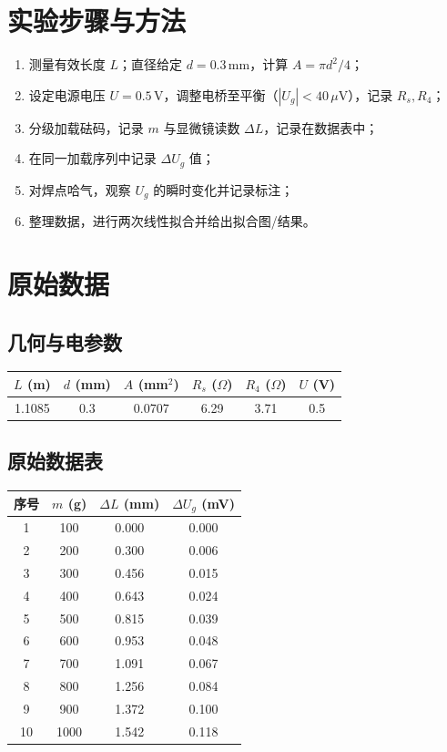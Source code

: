 \documentclass[12pt,a4paper]{article}
\begin{document}
\section{实验步骤与方法}
\begin{enumerate}
    \item 测量有效长度 $L$；直径给定 $d=0.3\,\mathrm{mm}$，计算 $A=\pi d^2/4$；
    \item 设定电源电压 $U=0.5\,\mathrm{V}$，调整电桥至平衡（$|U_g|<40\,\mu$V），记录 $R_s, R_4$；
    \item 分级加载砝码，记录 $m$ 与显微镜读数 $\Delta L$，记录在数据表中；
    \item 在同一加载序列中记录 $\Delta U_g$ 值；
    \item 对焊点哈气，观察 $U_g$ 的瞬时变化并记录标注；
    \item 整理数据，进行两次线性拟合并给出拟合图/结果。 
\end{enumerate}

\section{原始数据}
\subsection*{几何与电参数}
\begin{center}
\begin{tabular}{cccccc}
	\toprule
    $L$ (m) & $d$ (mm) & $A$ (mm$^2$) & $R_s$ ($\Omega$) & $R_4$ ($\Omega$) & $U$ (V) \\
    \midrule
	1.1085 & 0.3 & 0.0707 & 6.29 & 3.71 & 0.5 \\
    \bottomrule
\end{tabular}
\end{center}
\subsection*{原始数据表}
\begin{center}
\begin{tabular}{cccc}
\toprule
序号 & $m$ (g) & $\Delta L$ (mm) & $\Delta U_g$ (mV) \\
\midrule
1  & 100  & 0.000 & 0.000 \\
2  & 200  & 0.300 & 0.006 \\
3  & 300  & 0.456 & 0.015 \\
4  & 400  & 0.643 & 0.024 \\
5  & 500  & 0.815 & 0.039 \\
6  & 600  & 0.953 & 0.048 \\
7  & 700  & 1.091 & 0.067 \\
8  & 800  & 1.256 & 0.084 \\
9  & 900  & 1.372 & 0.100 \\
10 & 1000 & 1.542 & 0.118 \\
\bottomrule
\end{tabular}
\end{center}
\end{document}
